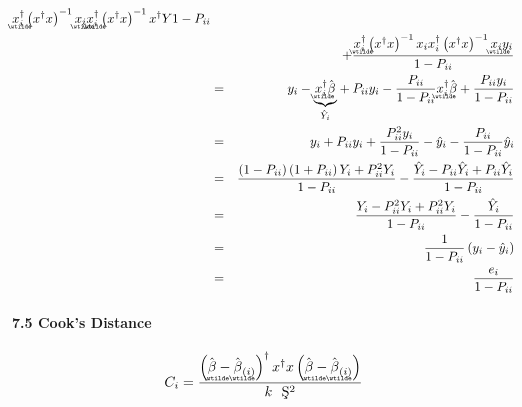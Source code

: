 \documentclass{article}
\begin{document}
\begin{eqnarray*}
{%
\underaccent{\wtilde}{x}%
_{i}^{\dagger }\left( x^{\dagger }x\right) ^{-1}%
\underaccent{\wtilde}{x}%
_{i}%
\underaccent{\wtilde}{x}%
_{i}^{\dagger }\left( x^{\dagger }x\right) ^{-1}x^{\dagger }Y}{1-P_{ii}} \\
&&+\frac{%
\underaccent{\wtilde}{x}%
_{i}^{\dagger }\left( x^{\dagger }x\right) ^{-1}x_{i}x_{i}^{\dagger }\left(
x^{\dagger }x\right) ^{-1}%
\underaccent{\wtilde}{x}%
_{i}y_{i}}{1-P_{ii}} \\
&=&y_{i}-\underset{\hat{Y}_{i}}{\underbrace{%
\underaccent{\wtilde}{x}%
_{i}^{\dagger }\hat{\beta}}}+P_{ii}y_{i}-\frac{P_{ii}}{1-P_{ii}}%
\underaccent{\wtilde}{x}%
_{i}^{\dagger }\hat{\beta}+\frac{P_{ii}y_{i}}{1-P_{ii}} \\
&=&y_{i}+P_{ii}y_{i}+\frac{P_{ii}^{2}y_{i}}{1-P_{ii}}-\hat{y}_{i}-\frac{%
P_{ii}}{1-P_{ii}}\hat{y}_{i} \\
&=&\frac{\left( 1-P_{ii}\right) \left( 1+P_{ii}\right) Y_{i}+P_{ii}^{2}Y_{i}%
}{1-P_{ii}}-\frac{\hat{Y}_{i}-P_{ii}\hat{Y}_{i}+P_{ii}\hat{Y}_{i}}{1-P_{ii}}
\\
&=&\frac{Y_{i}-P_{ii}^{2}Y_{i}+P_{ii}^{2}Y_{i}}{1-P_{ii}}-\frac{\hat{Y}_{i}}{%
1-P_{ii}} \\
&=&\frac{1}{1-P_{ii}}\left( y_{i}-\hat{y}_{i}\right) \\
&=&\frac{e_{i}}{1-P_{ii}}
\end{eqnarray*}

\bigskip

\bigskip

\paragraph{7.5 Cook's Distance}

\begin{equation*}
C_{i}=\frac{\left( 
\underaccent{\wtilde}{\hat{\beta}}%
-%
\underaccent{\wtilde}{\hat{\beta}}%
_{\left( i\right) }\right) ^{\dagger }x^{\dagger }x\left( 
\underaccent{\wtilde}{\hat{\beta}}%
-%
\underaccent{\wtilde}{\hat{\beta}}%
_{\left( i\right) }\right) }{k\text{\c{S}}^{2}}
\end{equation*}
\end{document}
